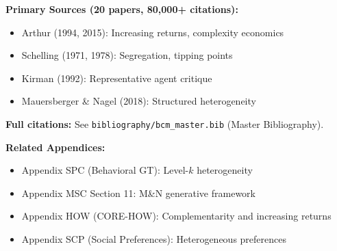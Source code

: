 \textbf{Primary Sources (20 papers, 80,000+ citations):}
\begin{itemize}[nosep]
    \item Arthur (1994, 2015): Increasing returns, complexity economics
    \item Schelling (1971, 1978): Segregation, tipping points
    \item Kirman (1992): Representative agent critique
    \item Mauersberger \& Nagel (2018): Structured heterogeneity
\end{itemize}

\textbf{Full citations:} See \texttt{bibliography/bcm\_master.bib} (Master Bibliography).

\textbf{Related Appendices:}
\begin{itemize}[nosep]
    \item Appendix SPC (Behavioral GT): Level-$k$ heterogeneity
    \item Appendix MSC Section 11: M\&N generative framework
    \item Appendix HOW (CORE-HOW): Complementarity and increasing returns
    \item Appendix SCP (Social Preferences): Heterogeneous preferences
\end{itemize}

